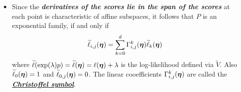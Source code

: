 \documentclass[11pt]{article}
\begin{document}
\begin{itemize}
 \item Since the \emph{\textbf{derivatives of the scores lie in the span of the scores}} at each point is characteristic of affine subspaces, it follows that $P$ is an exponential family, if and only if 
 \begin{align*}
 \widetilde{\ell}_{i,j}(\boldsymbol{\eta}) &= \sum_{k=0}^{d}\Gamma_{i,j}^{k}(\boldsymbol{\eta})\widetilde{\ell}_{k}(\boldsymbol{\eta})
 \end{align*} where $\widetilde{\ell}(\exp(\lambda)p)= \widetilde{\ell}(\boldsymbol{\eta}) = \ell(\boldsymbol{\eta}) + \lambda$ is the log-likelihood defined via $\widetilde{V}$. Also $\widetilde{\ell}_{0}(\boldsymbol{\eta}) = 1$ and $\widetilde{\ell}_{0,j}(\boldsymbol{\eta}) = 0$. The linear cooefficients $\Gamma_{i,j}^{k}(\boldsymbol{\eta})$ are called the \underline{\emph{\textbf{Christoffel symbol}}}. 
\end{itemize}
\end{document}
